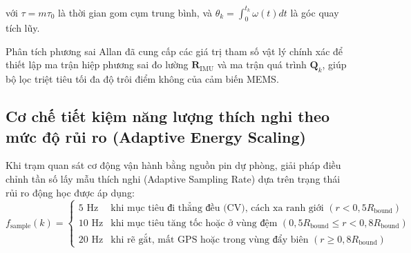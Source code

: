 với $\tau = m \tau_0$ là thời gian gom cụm trung bình, và $\theta_k = \int_0^{t_k} \omega(t) dt$ là góc quay tích lũy.

\begin{table}[H]
\centering
\caption{Các hệ số nhiễu đặc trưng từ đồ thị phương sai Allan của cảm biến quán tính MPU-9250}
\label{tab:allan-variance-coefficients-table}
\end{table}

Phân tích phương sai Allan đã cung cấp các giá trị tham số vật lý chính xác để thiết lập ma trận hiệp phương sai đo lường $\mathbf{R}_{\text{IMU}}$ và ma trận quá trình $\mathbf{Q}_k$, giúp bộ lọc triệt tiêu tối đa độ trôi điểm không của cảm biến MEMS.

\subsection{Cơ chế tiết kiệm năng lượng thích nghi theo mức độ rủi ro (Adaptive Energy Scaling)}

\hspace{0.5cm} Khi trạm quan sát cơ động vận hành bằng nguồn pin dự phòng, giải pháp điều chỉnh tần số lấy mẫu thích nghi (Adaptive Sampling Rate) dựa trên trạng thái rủi ro động học được áp dụng:
\begin{equation}
f_{\text{sample}}(k) = \begin{cases}
5\text{ Hz} & \text{khi mục tiêu đi thẳng đều (CV), cách xa ranh giới } (r < 0{,}5 R_{\text{bound}}) \\
10\text{ Hz} & \text{khi mục tiêu tăng tốc hoặc ở vùng đệm } (0{,}5 R_{\text{bound}} \le r < 0{,}8 R_{\text{bound}}) \\
20\text{ Hz} & \text{khi rẽ gắt, mất GPS hoặc trong vùng đẩy biên } (r \ge 0{,}8 R_{\text{bound}})
\end{cases}
\label{eq:adaptive-sampling-rate-rule}
\end{equation}

